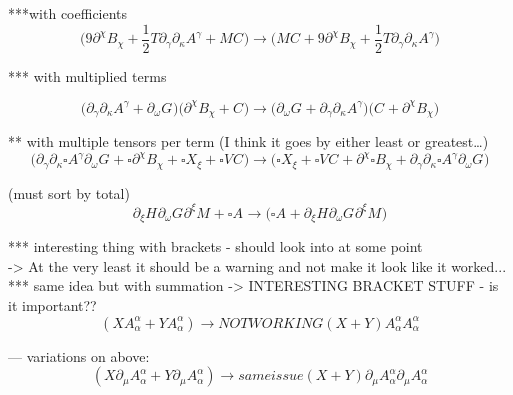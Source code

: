\documentclass{article}
\def\){\Big)}
\def\({\Big(}
\begin{document}
{***with coefficients
\begin{equation}
\(  9\partial^{\chi}B_{\chi} +\frac{1}{2}T \partial_{\gamma}\partial_{\kappa}A^{\gamma} +M C^{} \) \rightarrow 
\(M C^{} +9 \partial^{\chi}B_{\chi} +\frac{1}{2} T \partial_{\gamma}\partial_{\kappa}A^{\gamma} \)
\end{equation}

*** with multiplied terms

\begin{equation}
\(\partial_{\gamma} \partial_{\kappa}A^{\gamma}  + \partial_{\omega}G^{} \)\( \partial^{\chi}B_{\chi} + C^{} \) \rightarrow 
\( \partial_{\omega}G^{} + \partial_{\gamma}\partial_{\kappa}A^{\gamma} \)\( C^{} + \partial^{\chi}B_{\chi} \)
\end{equation}

** with multiple tensors per term (I think it goes by either least or greatest…)\\

\begin{equation}
\(\partial_{\gamma} \partial_{\kappa}\square A^{\gamma}\partial_{\omega}G^{} + \square \partial^{\chi}B_{\chi} + \square X_{\xi}+ \square V_{}C^{} \) \rightarrow 
\( \square X_{\xi} + \square V^{} C^{} + \partial^{\chi}\square B_{\chi} + \partial_{\gamma}\partial_{\kappa}\square A^{\gamma} \partial_{\omega}G^{} \)
\end{equation}

(must sort by total)\\
\begin{equation}
 \partial_{\xi}H^{}\partial_{\omega}G^{}\partial^{\xi}M^{} + \square A^{} \rightarrow 
\( \square A^{} + \partial_{\xi}H^{} \partial_{\omega}G^{} \partial^{\xi}M^{} \)
\end{equation}

*** interesting thing with brackets - should look into at some point\\
-> At the very least it should be a warning and not make it look like it worked...\\


*** same idea but with summation -> INTERESTING BRACKET STUFF - is it important??\\

{\color{red}
\begin{equation}
(X A^{\alpha}_{\alpha} + Y A^{\alpha}_{\alpha}) \rightarrow NOT WORKING
(X + Y ) A_{\alpha}^{\alpha} A_{\alpha}^{\alpha}
\end{equation}
}

— variations on above:
{\color{red}
\begin{equation}
(X \partial_{\mu}A^{\alpha}_{\alpha} + Y \partial_{\mu} A^{\alpha}_{\alpha}) \rightarrow same issue
(X + Y ) \partial_{\mu}A_{\alpha}^{\alpha} \partial_{\mu}A_{\alpha}^{\alpha}
\end{equation}
}

}
\end{document}
